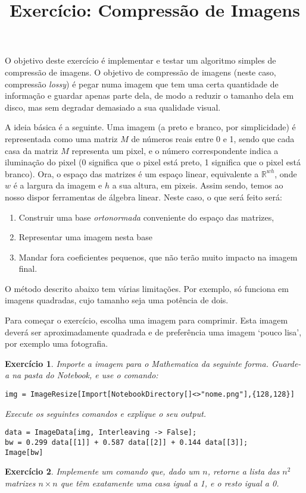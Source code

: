 \documentclass{article}
\title{Exercício: Compressão de Imagens}
\author{}
\date{}
\newtheorem{ex}{Exercício}
\newcommand{\R}{\mathbb{R}}
\begin{document}
O objetivo deste exercício é implementar e testar um algoritmo simples de compressão de imagens. O objetivo de compressão de imagens (neste caso, compressão \textit{lossy}) é pegar numa imagem que tem uma certa quantidade de informação e guardar apenas parte dela, de modo a reduzir o tamanho dela em disco, mas sem degradar demasiado a sua qualidade visual.

A ideia básica é a seguinte. Uma imagem (a preto e branco, por simplicidade) é representada como uma matriz $M$ de números reais entre 0 e 1, sendo que cada casa da matriz $M$ representa um pixel, e o número correspondente indica a iluminação do pixel (0 significa que o pixel está preto, 1 significa que o pixel está branco). Ora, o espaço das matrizes é um espaço linear, equivalente a $\R^{wh}$, onde $w$ é a largura da imagem e $h$ a sua altura, em pixeis. Assim sendo, temos ao nosso dispor ferramentas de álgebra linear. Neste caso, o que será feito será:
\begin{enumerate}
\item Construir uma base \emph{ortonormada} conveniente do espaço das matrizes,
\item Representar uma imagem nesta base
\item Mandar fora coeficientes pequenos, que não terão muito impacto na imagem final.
\end{enumerate}

O método descrito abaixo tem várias limitações. Por exemplo, só funciona em imagens quadradas, cujo tamanho seja uma potência de dois.

Para começar o exercício, escolha uma imagem para comprimir. Esta imagem deverá ser aproximadamente quadrada e	 de preferência uma imagem `pouco lisa', por exemplo uma fotografia.

\begin{ex}
Importe a imagem para o Mathematica da seguinte forma. Guarde-a na pasta do Notebook, e use o comando:
\begin{verbatim}
img = ImageResize[Import[NotebookDirectory[]<>"nome.png"],{128,128}]
\end{verbatim}

Execute os seguintes comandos e explique o seu output.
\begin{verbatim}
data = ImageData[img, Interleaving -> False];
bw = 0.299 data[[1]] + 0.587 data[[2]] + 0.144 data[[3]];
Image[bw]
\end{verbatim}
\end{ex}

\begin{ex}
Implemente um comando que, dado um $n$, retorne a lista das $n^2$ matrizes $n \times n$ que têm exatamente uma casa igual a 1, e o resto igual a 0.
\end{ex}
\end{document}
